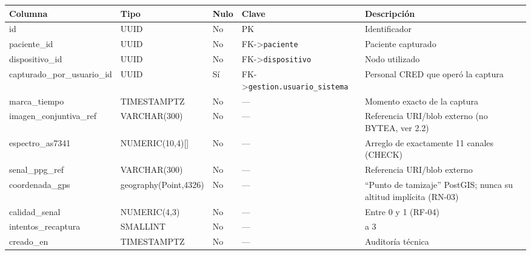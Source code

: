 \documentclass[11pt,a4paper]{article}
\begin{document}
{\small
\begin{longtable}[]{@{}
  >{\raggedright\arraybackslash}p{}
  >{\raggedright\arraybackslash}p{}
  >{\raggedright\arraybackslash}p{}
  >{\raggedright\arraybackslash}p{}
  >{\raggedright\arraybackslash}p{}@{}}
\toprule\noalign{}
\begin{minipage}[b]{\linewidth}\raggedright
Columna
\end{minipage} & \begin{minipage}[b]{\linewidth}\raggedright
Tipo
\end{minipage} & \begin{minipage}[b]{\linewidth}\raggedright
Nulo
\end{minipage} & \begin{minipage}[b]{\linewidth}\raggedright
Clave
\end{minipage} & \begin{minipage}[b]{\linewidth}\raggedright
Descripción
\end{minipage} \\
\midrule\noalign{}
\endhead
\bottomrule\noalign{}
\endlastfoot
id & UUID & No & PK & Identificador \\
paciente\_id & UUID & No & FK-\textgreater{}\texttt{paciente} & Paciente capturado \\
dispositivo\_id & UUID & No & FK-\textgreater{}\texttt{dispositivo} & Nodo utilizado \\
capturado\_por\_usuario\_id & UUID & Sí & FK-\textgreater{}\texttt{gestion.usuario\_sistema} & Personal CRED que operó la captura \\
marca\_tiempo & TIMESTAMPTZ & No & --- & Momento exacto de la captura \\
imagen\_conjuntiva\_ref & VARCHAR(300) & No & --- & Referencia URI/blob externo (no BYTEA, ver 2.2) \\
espectro\_as7341 & NUMERIC(10,4){[}{]} & No & --- & Arreglo de exactamente 11 canales (CHECK) \\
senal\_ppg\_ref & VARCHAR(300) & No & --- & Referencia URI/blob externo \\
coordenada\_gps & geography(Point,4326) & No & --- & ``Punto de tamizaje'' PostGIS; nunca su altitud implícita (RN-03) \\
calidad\_senal & NUMERIC(4,3) & No & --- & Entre 0 y 1 (RF-04) \\
intentos\_recaptura & SMALLINT & No & --- & 0 a 3 \\
creado\_en & TIMESTAMPTZ & No & --- & Auditoría técnica \\
\end{longtable}
}
\end{document}
